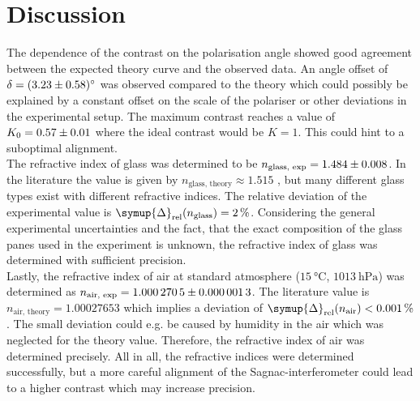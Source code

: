 \section{Discussion}
\label{sec:Diskussion}

The dependence of the contrast on the polarisation angle showed good agreement between the expected theory curve and the observed data. An angle offset of 
$\delta = \qty{3.23 +- 0.58}{\degree}$ was observed compared to the theory which could possibly be explained by a constant offset on the scale of the polariser or other 
deviations in the experimental setup. The maximum contrast reaches a value of $K_0 = \num{0.57 +- 0.01}$ where the ideal contrast would be $K = 1$. This could hint to a 
suboptimal alignment. \\
The refractive index of glass was determined to be $n_\text{glass, exp} = \num{1.484 +- 0.008}$. In the literature the value is given by $n_\text{glass, theory} \approx \num{1.515}$
\cite{Refractive_Index}, but many different glass types exist with different refractive indices.
The relative deviation of the experimental value is $\symup{\Delta}_\text{rel} (n_\text{glass}) = \qty{2}{\percent}$. Considering the general experimental uncertainties and the fact, that the exact 
composition of the glass panes used in the experiment is unknown, the refractive index of glass was determined with sufficient precision.\\
Lastly, the refractive index of air at standard atmosphere ($\qty{15}{\degreeCelsius}$, $\qty{1013}{\hecto\pascal}$) was determined as $n_\text{air, exp} = \num{1.0002705+-0.0000013}$.
The literature value is $n_\text{air, theory} = 1.00027653$ \cite{Refractive_Index} which implies a deviation of $\symup{\Delta}_\text{rel} (n_\text{air}) < \qty{0.001}{\percent}$.
The small deviation could e.g. be caused by humidity in the air which was neglected for the theory value. Therefore, the refractive index of air was determined precisely.
All in all, the refractive indices were determined successfully, but a more careful alignment of the Sagnac-interferometer could lead to a higher contrast which may increase precision.

